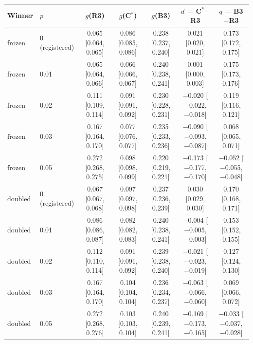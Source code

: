 \begin{tabular}{llccccc}
\toprule
Winner & $p$ & $g$(R3) & $g$(C$^*$) & $g$(B3) & $d$ = C$^*$$-$R3 & $q$ = B3$-$R3 \\
\midrule
frozen & 0 (registered) & 0.065 [0.064, 0.065] & 0.086 [0.085, 0.086] & 0.238 [0.237, 0.240] & 0.021 [0.020, 0.021] & 0.173 [0.172, 0.175] \\
frozen & 0.01 & 0.065 [0.064, 0.066] & 0.066 [0.066, 0.067] & 0.240 [0.238, 0.241] & 0.001 [0.000, 0.003] & 0.175 [0.173, 0.176] \\
frozen & 0.02 & 0.111 [0.109, 0.114] & 0.091 [0.091, 0.092] & 0.230 [0.228, 0.231] & $-$0.020 [$-$0.022, $-$0.018] & 0.119 [0.116, 0.121] \\
frozen & 0.03 & 0.167 [0.164, 0.170] & 0.077 [0.076, 0.077] & 0.235 [0.233, 0.236] & $-$0.090 [$-$0.093, $-$0.087] & 0.068 [0.065, 0.071] \\
frozen & 0.05 & 0.272 [0.268, 0.275] & 0.098 [0.098, 0.099] & 0.220 [0.219, 0.221] & $-$0.173 [$-$0.177, $-$0.170] & $-$0.052 [$-$0.055, $-$0.048] \\
doubled & 0 (registered) & 0.067 [0.067, 0.068] & 0.097 [0.097, 0.098] & 0.237 [0.236, 0.239] & 0.030 [0.029, 0.030] & 0.170 [0.168, 0.171] \\
doubled & 0.01 & 0.086 [0.086, 0.087] & 0.082 [0.082, 0.083] & 0.240 [0.238, 0.241] & $-$0.004 [$-$0.005, $-$0.003] & 0.153 [0.152, 0.155] \\
doubled & 0.02 & 0.112 [0.110, 0.114] & 0.091 [0.091, 0.092] & 0.239 [0.238, 0.240] & $-$0.021 [$-$0.023, $-$0.019] & 0.127 [0.124, 0.130] \\
doubled & 0.03 & 0.167 [0.164, 0.170] & 0.104 [0.104, 0.104] & 0.236 [0.234, 0.237] & $-$0.063 [$-$0.066, $-$0.060] & 0.069 [0.066, 0.072] \\
doubled & 0.05 & 0.272 [0.268, 0.276] & 0.103 [0.103, 0.104] & 0.240 [0.239, 0.241] & $-$0.169 [$-$0.173, $-$0.165] & $-$0.033 [$-$0.037, $-$0.028] \\
\bottomrule
\end{tabular}
